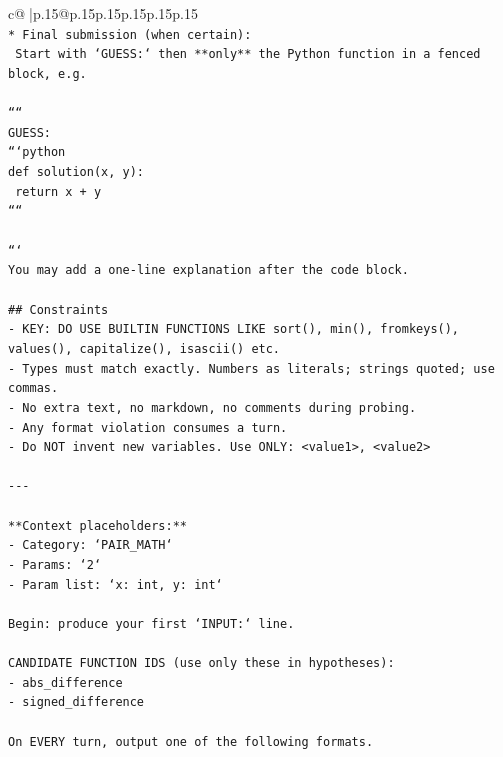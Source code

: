 \documentclass{article}
\begin{document}
{\begin{supertabular}{c@{$\;$}|p{.15\linewidth}@{}p{.15\linewidth}p{.15\linewidth}p{.15\linewidth}p{.15\linewidth}p{.15\linewidth}}
{{{\\ 
\texttt{* Final submission (when certain):} \\
\texttt{  Start with `GUESS:` then **only** the Python function in a fenced block, e.g.} \\
\\ 
\texttt{````} \\
\texttt{GUESS:} \\
\texttt{```python} \\
\texttt{def solution(x, y):} \\
\texttt{    return x + y} \\
\texttt{````} \\
\\ 
\texttt{```} \\
\texttt{You may add a one{-}line explanation after the code block.} \\
\\ 
\texttt{\#\# Constraints} \\
\texttt{{-} KEY: DO USE BUILTIN FUNCTIONS LIKE sort(), min(), fromkeys(), values(), capitalize(), isascii() etc.} \\
\texttt{{-} Types must match exactly. Numbers as literals; strings quoted; use commas.} \\
\texttt{{-} No extra text, no markdown, no comments during probing.} \\
\texttt{{-} Any format violation consumes a turn.} \\
\texttt{{-} Do NOT invent new variables. Use ONLY: <value1>, <value2>} \\
\\ 
\texttt{{-}{-}{-}} \\
\\ 
\texttt{**Context placeholders:**} \\
\texttt{{-} Category: `PAIR\_MATH`} \\
\texttt{{-} Params: `2`} \\
\texttt{{-} Param list: `x: int, y: int`} \\
\\ 
\texttt{Begin: produce your first `INPUT:` line.} \\
\\ 
\texttt{CANDIDATE FUNCTION IDS (use only these in hypotheses):} \\
\texttt{{-} abs\_difference} \\
\texttt{{-} signed\_difference} \\
\\ 
\texttt{On EVERY turn, output one of the following formats.} \\
}}}
\end{supertabular}}
\end{document}
